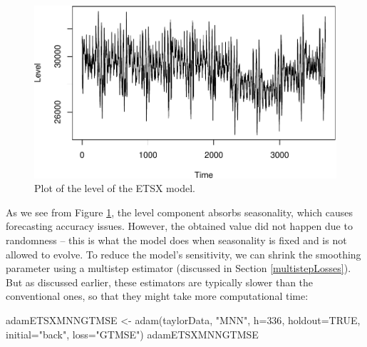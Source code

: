\documentclass[
]{book}
\newenvironment{Shaded}{\begin{snugshade}}{\end{snugshade}}
\newcommand{\AttributeTok}[1]{\textcolor[rgb]{0.77,0.63,0.00}{#1}}
\newcommand{\ConstantTok}[1]{\textcolor[rgb]{0.00,0.00,0.00}{#1}}
\newcommand{\DecValTok}[1]{\textcolor[rgb]{0.00,0.00,0.81}{#1}}
\newcommand{\FunctionTok}[1]{\textcolor[rgb]{0.00,0.00,0.00}{#1}}
\newcommand{\NormalTok}[1]{#1}
\newcommand{\OtherTok}[1]{\textcolor[rgb]{0.56,0.35,0.01}{#1}}
\newcommand{\SpecialCharTok}[1]{\textcolor[rgb]{0.00,0.00,0.00}{#1}}
\newcommand{\StringTok}[1]{\textcolor[rgb]{0.31,0.60,0.02}{#1}}
\theoremstyle{definition}
\theoremstyle{definition}
\theoremstyle{definition}
\theoremstyle{definition}
\theoremstyle{remark}
\begin{document}
\begin{Shaded}
\end{Shaded}

\begin{figure}
\centering
\includegraphics{Svetunkov--2022----ADAM_files/figure-latex/adamETSXMNN121-1.pdf}
\caption{\label{fig:adamETSXMNN121}Plot of the level of the ETSX model.}
\end{figure}

As we see from Figure \ref{fig:adamETSXMNN121}, the level component absorbs seasonality, which causes forecasting accuracy issues. However, the obtained value did not happen due to randomness -- this is what the model does when seasonality is fixed and is not allowed to evolve. To reduce the model's sensitivity, we can shrink the smoothing parameter using a multistep estimator (discussed in Section \ref{multistepLosses}). But as discussed earlier, these estimators are typically slower than the conventional ones, so that they might take more computational time:

\begin{Shaded}
\begin{Highlighting}[]
\NormalTok{adamETSXMNNGTMSE }\OtherTok{\textless{}{-}} \FunctionTok{adam}\NormalTok{(taylorData, }\StringTok{"MNN"}\NormalTok{,}
                         \AttributeTok{h=}\DecValTok{336}\NormalTok{, }\AttributeTok{holdout=}\ConstantTok{TRUE}\NormalTok{,}
                         \AttributeTok{initial=}\StringTok{"back"}\NormalTok{, }\AttributeTok{loss=}\StringTok{"GTMSE"}\NormalTok{)}
\NormalTok{adamETSXMNNGTMSE}
\end{Highlighting}
\end{Shaded}
\end{document}
